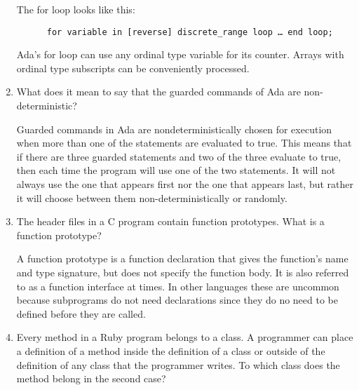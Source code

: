 \begin{enumerate}
  \begin{answer}

    The for loop looks like this:
    \begin{lstlisting}
      for variable in [reverse] discrete_range loop … end loop;
    \end{lstlisting}
    Ada’s for loop can use any ordinal type variable for
    its counter. Arrays with ordinal type subscripts can be
    conveniently processed.

  \end{answer}

  \item What does it mean to say that the guarded commands
    of Ada are non-deterministic?

  \begin{answer}

    Guarded commands in Ada are nondeterministically chosen
    for execution when more than one of the statements are
    evaluated to true. This means that if there are three
    guarded statements and two of the three evaluate to true,
    then each time the program will use one of the two
    statements. It will not always use the one that appears
    first nor the one that appears last, but rather it will
    choose between them non-deterministically or randomly.

  \end{answer}

  \item The header files in a C program contain function
    prototypes. What is a function prototype?

  \begin{answer}

    A function prototype is a function declaration that gives
    the function's name and type signature, but does not
    specify the function body. It is also referred to as a
    function interface at times. In other languages these are
    uncommon because subprograms do not need declarations since
    they do no need to be defined before they are called.

  \end{answer}

  \item Every method in a Ruby program belongs to a class.
    A programmer can place a definition of a method inside
    the definition of a class or outside of the definition
    of any class that the programmer writes. To which class
    does the method belong in the second case?


\end{enumerate}
